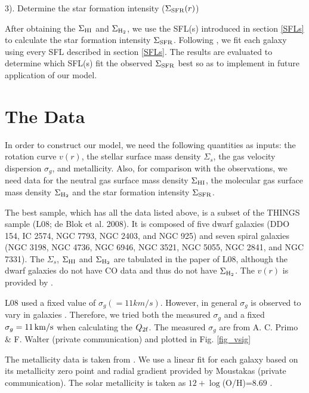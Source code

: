 \documentclass[12pt,preprint]{aastex}
\begin{document}
3). Determine the star formation intensity ($\Sigma_{\rm SFR}(r)$)

After obtaining the $\Sigma_{\rm HI}$ and $\Sigma_{\rm H_2}$, we use the SFL(s) introduced in section \ref{SFLs} to calculate the star formation intensity $\Sigma_{\rm SFR}$.  Following \citet{tan10}, we fit each galaxy using every SFL described in section \ref{SFLs}.  The results are evaluated to determine which SFL(s) fit the observed $\Sigma_{\rm SFR}$ best so as to implement in future application of our model.




\section{The Data}
\label{data}
In order to construct our model, we need the following  quantities as inputs: the rotation curve $v(r)$, the stellar surface mass density $\Sigma_s$, the gas velocity dispersion $\sigma_g$, and metallicity. Also, for comparison with the observations, we need data for the neutral gas surface mass density $\Sigma_{\rm HI}$, the molecular gas surface mass density $\Sigma_{\rm H_2}$ and the star formation intensity $\Sigma_{\rm SFR}$.

The best sample, which has all the data listed above, is a subset of the THINGS sample (L08; de Blok et al. 2008). It is composed of five dwarf galaxies (DDO 154, IC 2574, NGC 7793, NGC 2403, and NGC 925) and seven spiral galaxies (NGC 3198, NGC 4736, NGC 6946, NGC 3521, NGC 5055, NGC 2841, and NGC 7331). The $\Sigma_s$, $\Sigma_{\rm HI}$ and $\Sigma_{\rm H_2}$ are tabulated in the paper of L08, although the dwarf galaxies do not have CO data and thus do not have $\Sigma_{\rm H_2}$. The $v(r)$ is provided by \citet{deb08}.

L08 used a fixed value of $\sigma_g (=11 km/s)$. However, 
in general $\sigma_g$ is observed to vary in galaxies  \citep{tam09,obr10}. 
Therefore, we tried both the measured $\sigma_g$ and a fixed $\sigma_g=11\, {\rm km/s}$ when calculating the $Q_{\rm 2f}$.
The measured $\sigma_g$ are from A. C. Primo \& F. Walter (private communication) and plotted in Fig. \ref{fig_vsig}




The metallicity data is taken from \citet{mou10}. We use a linear fit for each galaxy based on its metallicity zero point and radial gradient  \citep{kob04} provided by Moustakas (private communication). The solar metallicity is taken as $12+\log$(O/H)=$8.69$ \citep{mou10,asp09}.
\end{document}
